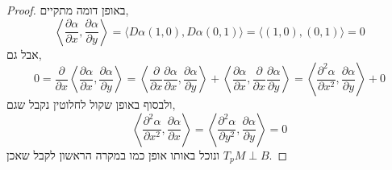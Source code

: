 \begin{proof}
	באופן דומה מתקיים,
	\[
		\left\langle \frac{\partial \alpha}{\partial x}, \frac{\partial \alpha}{\partial y} \right\rangle
		= \langle D \alpha (1, 0), D \alpha (0, 1) \rangle
		= \langle (1, 0), (0, 1) \rangle
		= 0
	\]
	אבל גם,
	\[
		0
		= \frac{\partial}{\partial x} \left\langle \frac{\partial \alpha}{\partial x}, \frac{\partial \alpha}{\partial y} \right\rangle
		= \left\langle \frac{\partial}{\partial x} \frac{\partial \alpha}{\partial x}, \frac{\partial \alpha}{\partial y} \right\rangle
		+ \left\langle \frac{\partial \alpha}{\partial x}, \frac{\partial}{\partial x} \frac{\partial \alpha}{\partial y} \right\rangle
		= \left\langle \frac{\partial^2 \alpha}{\partial x^2}, \frac{\partial \alpha}{\partial y} \right\rangle + 0
	\]
	ולבסוף באופן שקול לחלוטין נקבל שגם,
	\[
		\left\langle \frac{\partial^2 \alpha}{\partial x^2}, \frac{\partial \alpha}{\partial x} \right\rangle
		= \left\langle \frac{\partial^2 \alpha}{\partial y^2}, \frac{\partial \alpha}{\partial y} \right\rangle
		= 0
	\]
	ונוכל באותו אופן כמו במקרה הראשון לקבל שאכן $T_p M \perp B$.
\end{proof}

